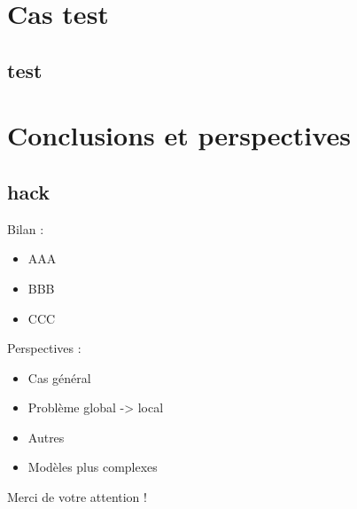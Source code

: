 \documentclass[compress, hyperref={unicode, bookmarks=true}]{beamer}
\begin{document}
\section[Cas test]{Cas test}
\subsection{test}





\section{Conclusions et perspectives}
\subsection{hack}
\begin{frame}
  Bilan :
  \begin{itemize}
    \item AAA
    \item BBB
    \item CCC
  \end{itemize}
  \vspace{1cm}
  \pause
  Perspectives :
  \begin{itemize}
    \item Cas g\'en\'eral
    \item Probl\`eme global -> local
    \item Autres
    \item Modèles plus complexes
  \end{itemize}
\end{frame}


\begin{frame}
\begin{center}
\Huge Merci de votre attention !
\end{center}
\end{frame}


\tiny

\end{document}
